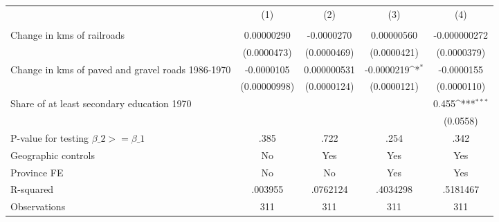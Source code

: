 {
\def\sym#1{\ifmmode^{#1}\else\(^{#1}\)\fi}
\begin{tabular}{l*{4}{c}}
\hline\hline
                &\multicolumn{1}{c}{(1)}&\multicolumn{1}{c}{(2)}&\multicolumn{1}{c}{(3)}&\multicolumn{1}{c}{(4)}\\
                &\multicolumn{1}{c}{}&\multicolumn{1}{c}{}&\multicolumn{1}{c}{}&\multicolumn{1}{c}{}\\
\hline
Change in kms of railroads&0.00000290         &-0.0000270         &0.00000560         &-0.000000272         \\
                &(0.0000473)         &(0.0000469)         &(0.0000421)         &(0.0000379)         \\
[1em]
Change in kms of paved and gravel roads 1986-1970&-0.0000105         &0.000000531         &-0.0000219\sym{*}  &-0.0000155         \\
                &(0.00000998)         &(0.0000124)         &(0.0000121)         &(0.0000110)         \\
[1em]
Share of at least secondary education 1970&                  &                  &                  &    0.455\sym{***}\\
                &                  &                  &                  & (0.0558)         \\
\hline
P-value for testing $\beta\_{2} >= \beta\_{1}$&     .385         &     .722         &     .254         &     .342         \\
Geographic controls&       No         &      Yes         &      Yes         &      Yes         \\
Province FE     &       No         &       No         &      Yes         &      Yes         \\
R-squared       &  .003955         & .0762124         & .4034298         & .5181467         \\
Observations    &      311         &      311         &      311         &      311         \\
\hline\hline
\end{tabular}
}
